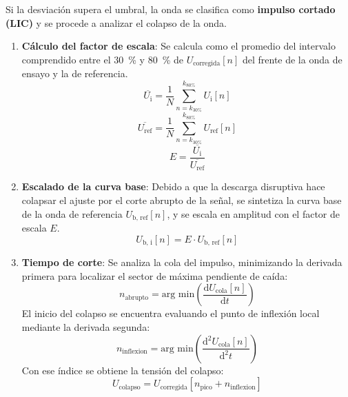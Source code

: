 Si la desviación supera el umbral, la onda se clasifica como \textbf{impulso cortado (LIC)} y se procede a analizar el colapso de la onda.
\begin{enumerate}[resume]
    \item \textbf{Cálculo del factor de escala}: Se calcula como el promedio del intervalo comprendido entre el \qty{30}{\percent} y \qty{80}{\percent} de $U_{\text{corregida}}[n]$ del frente de la onda de ensayo y la de referencia.
    \begin{equation}
        \overline{U_\text{i}} = \frac{1}{N} \sum_{n = k_{30\%}}^{k_{80\%}} U_\text{i}[n]
    \end{equation}
    \begin{equation}
        \overline{U_\text{ref}} = \frac{1}{N} \sum_{n = k_{30\%}}^{k_{80\%}} U_\text{ref}[n]
    \end{equation}
    \begin{equation}
        E = \frac{\overline{U_\text{i}}}{\overline{U_\text{ref}}}
        \label{eq:factor_escala_e}
    \end{equation}
    \item \textbf{Escalado de la curva base}: Debido a que la descarga disruptiva hace colapsar el ajuste por el corte abrupto de la señal, se sintetiza la curva base de la onda de referencia $U_\text{b, ref}[n]$, y se escala en amplitud con el factor de escala $E$.
    \begin{equation}
        U_\text{b, i}[n] = E \cdot U_\text{b, ref}[n]
        \label{eq:curva_base_lic}
    \end{equation}
    \item \textbf{Tiempo de corte}: Se analiza la cola del impulso, minimizando la derivada primera para localizar el sector de máxima pendiente de caída:
    \begin{equation}
        n_\text{abrupto} = \text{arg min}\left(\frac{\text{d} U_{\text{cola}}[n]}{\text{d} t}\right)
        \label{eq:gradiente_colapso}
    \end{equation}
    El inicio del colapso se encuentra evaluando el punto de inflexión local mediante la derivada segunda:
    \begin{equation}
        n_\text{inflexion} = \text{arg min}\left(\frac{\text{d}^2 U_\text
        {cola}[n]}{\text{d}^2 t}\right)
        \label{eq:punto_inflexión}
    \end{equation}
    Con ese índice se obtiene la tensión del colapso:
    \begin{equation}
        U_\text{colapso} = U_\text{corregida}[n_\text{pico} + n_\text{inflexion}]

\end{equation}
\end{enumerate}
